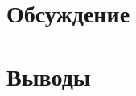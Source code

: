 \documentclass{article}
\begin{document}
  \clearpage

  \section{Обсуждение}

  \section{Выводы}
\end{document}
